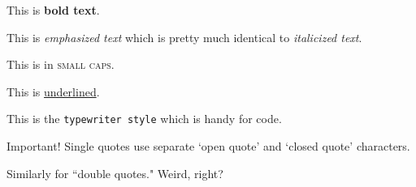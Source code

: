 \documentclass{article}
\begin{document}

This is \textbf{bold text}. %

This is \emph{emphasized text} which is pretty much identical to \textit{italicized text}.

This is in \textsc{small caps}.

This is \underline{underlined}.

This is the \texttt{typewriter style} which is handy for code.

Important!  Single quotes use separate `open quote' and `closed quote' characters. %

Similarly for ``double quotes."  Weird, right?
\end{document}
